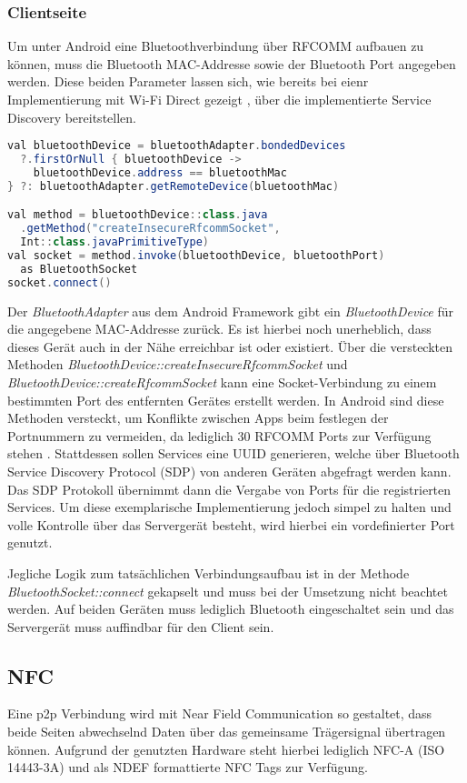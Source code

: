        \subsubsection{Clientseite}
        Um unter Android eine Bluetoothverbindung über RFCOMM aufbauen zu können, muss die Bluetooth MAC-Addresse sowie der Bluetooth Port angegeben werden. Diese beiden Parameter lassen sich, wie bereits bei eienr Implementierung mit Wi-Fi Direct gezeigt \cite{aiProject}, über die implementierte Service Discovery bereitstellen. 
        \begin{lstlisting}[frame=bt, label={lst:android:bluetooth}, language=Java, caption=Verbindungsaufbau mit Bluetooth (Clientcode in Kotlin)]
val bluetoothDevice = bluetoothAdapter.bondedDevices
  ?.firstOrNull { bluetoothDevice ->
    bluetoothDevice.address == bluetoothMac
} ?: bluetoothAdapter.getRemoteDevice(bluetoothMac)

val method = bluetoothDevice::class.java
  .getMethod("createInsecureRfcommSocket",
  Int::class.javaPrimitiveType)
val socket = method.invoke(bluetoothDevice, bluetoothPort)
  as BluetoothSocket
socket.connect()
        \end{lstlisting}
        Der {\it BluetoothAdapter} aus dem Android Framework gibt ein {\it BluetoothDevice} für die angegebene MAC-Addresse zurück. Es ist hierbei noch unerheblich, dass dieses Gerät auch in der Nähe erreichbar ist oder existiert. Über die versteckten Methoden {\it BluetoothDevice::createInsecureRfcommSocket} und {\it BluetoothDevice::createRfcommSocket} kann eine Socket-Verbindung zu einem bestimmten Port des entfernten Gerätes erstellt werden. In Android sind diese Methoden versteckt, um Konflikte zwischen Apps beim festlegen der Portnummern zu vermeiden, da lediglich 30 RFCOMM Ports zur Verfügung stehen \cite{bluezRfComm}. Stattdessen sollen Services eine UUID generieren, welche über Bluetooth Service Discovery Protocol (SDP) von anderen Geräten abgefragt werden kann. Das SDP Protokoll übernimmt dann die Vergabe von Ports für die registrierten Services. Um diese exemplarische Implementierung jedoch simpel zu halten und volle Kontrolle über das Servergerät besteht, wird hierbei ein vordefinierter Port genutzt.

         Jegliche Logik zum tatsächlichen Verbindungsaufbau ist in der Methode {\it BluetoothSocket::connect} gekapselt und muss bei der Umsetzung nicht beachtet werden. Auf beiden Geräten muss lediglich Bluetooth eingeschaltet sein und das Servergerät muss auffindbar für den Client sein.
    \subsection{NFC}
        Eine p2p Verbindung wird mit Near Field Communication so gestaltet, dass beide Seiten abwechselnd Daten über das gemeinsame Trägersignal übertragen können.  Aufgrund der genutzten Hardware steht hierbei lediglich NFC-A (ISO 14443-3A) und als NDEF formattierte NFC Tags zur Verfügung.
